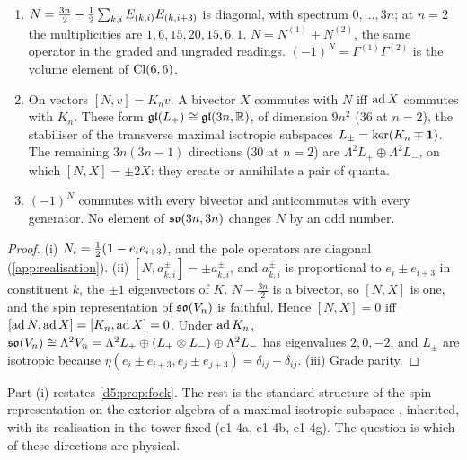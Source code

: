 \begin{proposition}
\label{e1:prop:Nbiv}
\begin{enumerate}[label=(\roman*),leftmargin=2.2em]
\item $N=\tfrac{3n}2-\tfrac12\sum_{k,i}E_{(k,i)}E_{(k,i+3)}$ is diagonal, with spectrum $0,\dots,3n$; at $n=2$ the multiplicities are
$1,6,15,20,15,6,1$. $N=N^{(1)}+N^{(2)}$, the same operator in the graded and ungraded readings. $(-1)^N=\Gamma^{(1)}\Gamma^{(2)}$ is the volume element of
$\mathrm{Cl}(6,6)$.
\item On vectors $[N,v]=K_nv$. A bivector $X$ commutes with $N$ iff $\operatorname{ad} X$ commutes with $K_n$. These form
$\mathfrak{gl}(L_+)\cong\mathfrak{gl}(3n,\mathbb{R})$, of dimension $9n^2$ ($36$ at $n=2$), the stabiliser of the transverse maximal isotropic subspaces
$L_\pm=\ker(K_n\mp\mathbf 1)$. The remaining $3n(3n-1)$ directions ($30$ at $n=2$) are $\Lambda^2L_+\oplus\Lambda^2L_-$, on which $[N,X]=\pm2X$: they create
or annihilate a pair of quanta.
\item $(-1)^N$ commutes with every bivector and anticommutes with every generator. No element of $\mathfrak{so}(3n,3n)$ changes $N$ by an odd number.
\end{enumerate}
\end{proposition}

\begin{proof}
(i) $N_i=\tfrac12(\mathbf 1-e_ie_{i+3})$, and the pole operators are diagonal (\cref{app:realisation}). (ii) $[N,a^\pm_{k,i}]=\pm a^\pm_{k,i}$, and
$a^\pm_{k,i}$ is proportional to $e_i\pm e_{i+3}$ in constituent $k$, the $\pm1$ eigenvectors of $K$. $N-\tfrac{3n}2$ is a bivector, so $[N,X]$
is one, and the spin representation of $\mathfrak{so}(V_n)$ is faithful. Hence $[N,X]=0$ iff $[\operatorname{ad} N,\operatorname{ad} X]=[K_n,\operatorname{ad} X]=0$. Under $\operatorname{ad} K_n$,
$\mathfrak{so}(V_n)\cong\Lambda^2V_n=\Lambda^2L_+\oplus(L_+\otimes L_-)\oplus\Lambda^2L_-$ has eigenvalues $2,0,-2$, and $L_\pm$ are isotropic because
$\eta(e_i\pm e_{i+3},e_j\pm e_{j+3})=\delta_{ij}-\delta_{ij}$. (iii) Grade parity.
\end{proof}

Part (i) restates \cref{d5:prop:fock}. The rest is the standard structure of the spin representation on the exterior algebra of
a maximal isotropic subspace \cite{Chevalley54}, inherited, with its realisation in the tower fixed (e1-4a, e1-4b, e1-4g). The question
is which of these directions are physical.

